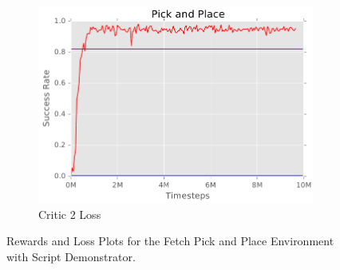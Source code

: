 \begin{figure}[h!]
\begin{subfigure}[b]{0.475\textwidth}
        \centering 
        \includegraphics[width=\textwidth]{images/FPAPB.png}
        \caption[]%
        {{\small Critic 2 Loss}}    
        \label{fig:mean and std of net44}
    \end{subfigure}
    \caption[ Rewards and Loss Plots for the Fetch Pick and Place Environment with Script Demonstrator. ]
    {\small Rewards and Loss Plots for the Fetch Pick and Place Environment with Script Demonstrator.} 
    \label{fig:mean and std of nets}
\end{figure}

